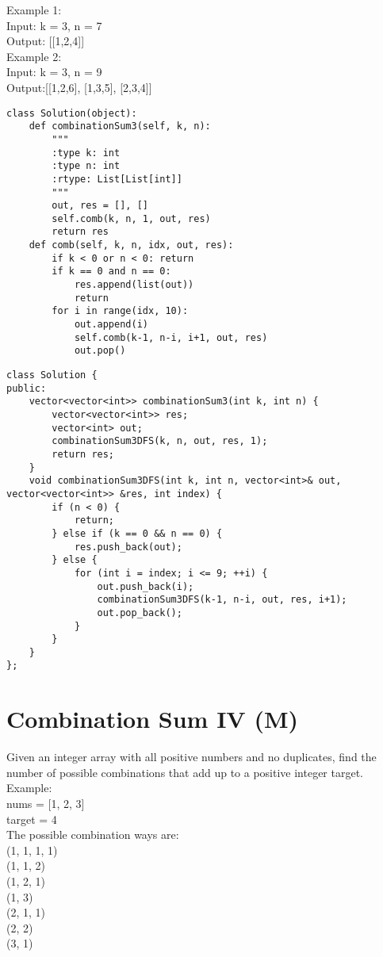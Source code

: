 Example 1:\\
Input: k = 3, n = 7\\
Output: [[1,2,4]]\\

Example 2:\\
Input: k = 3, n = 9\\
Output:[[1,2,6], [1,3,5], [2,3,4]]\\

\begin{lstlisting}
class Solution(object):
    def combinationSum3(self, k, n):
        """
        :type k: int
        :type n: int
        :rtype: List[List[int]]
        """
        out, res = [], []
        self.comb(k, n, 1, out, res)
        return res
    def comb(self, k, n, idx, out, res):
        if k < 0 or n < 0: return
        if k == 0 and n == 0: 
            res.append(list(out))
            return
        for i in range(idx, 10):
            out.append(i)
            self.comb(k-1, n-i, i+1, out, res)
            out.pop()
\end{lstlisting}

\begin{lstlisting}
class Solution {
public:
    vector<vector<int>> combinationSum3(int k, int n) {
        vector<vector<int>> res;
        vector<int> out;
        combinationSum3DFS(k, n, out, res, 1);
        return res;
    }
    void combinationSum3DFS(int k, int n, vector<int>& out, vector<vector<int>> &res, int index) {
        if (n < 0) {
            return;
        } else if (k == 0 && n == 0) {
            res.push_back(out);
        } else {
            for (int i = index; i <= 9; ++i) {
                out.push_back(i);
                combinationSum3DFS(k-1, n-i, out, res, i+1);
                out.pop_back();
            }
        }
    }
};
\end{lstlisting}

\section{Combination Sum IV (M)}
Given an integer array with all positive numbers and no duplicates, find the number of possible combinations that add up to a positive integer target. \\

Example:\\
nums = [1, 2, 3]\\
target = 4\\

The possible combination ways are:\\
(1, 1, 1, 1)\\
(1, 1, 2)\\
(1, 2, 1)\\
(1, 3)\\
(2, 1, 1)\\
(2, 2)\\
(3, 1)\\

